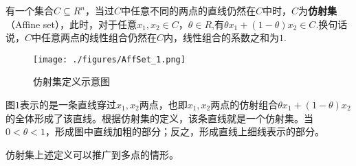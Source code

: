 
有一个集合$C \subseteq R^n$，当过$C$中任意不同的两点的直线仍然在$C$中时，$C$为\textbf{仿射集}（Affine set），此时，对于任意$x_1,x_2 \in C$，$\theta \in R$,有$\theta x_1+(1-\theta)x_2 \in C$.换句话说，$C$中任意两点的线性组合仍然在$C$内，线性组合的系数之和为$1$.

\begin{figure}[ht]
\centering
\texttt{[image: ./figures/AffSet\_1.png]}
\caption{仿射集定义示意图} \label{AffSet_fig1}
\end{figure}

图$1$表示的是一条直线穿过$x_1,x_2$两点，也即$x_1,x_2$两点的仿射组合$\theta x_1+(1-\theta)x_2$的全体形成了该直线。根据仿射集的定义，该条直线就是一个仿射集。当$0<\theta<1$，形成图中直线加粗的部分；反之，形成直线上细线表示的部分。

仿射集上述定义可以推广到多点的情形。
